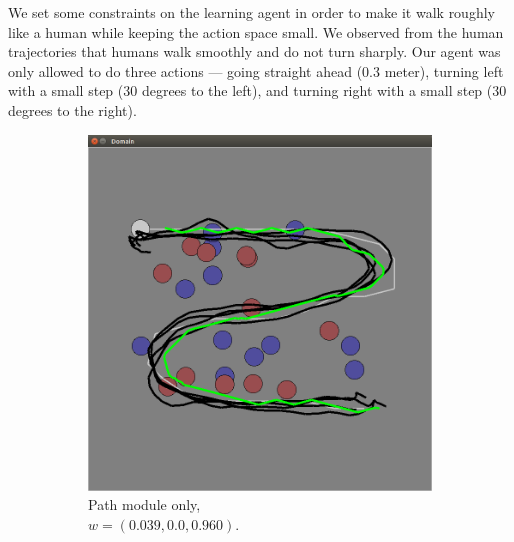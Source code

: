 We set some constraints on the learning agent in order to make it walk roughly
like a human while keeping the action space small.  We observed from the human
trajectories that humans walk smoothly and do not turn sharply.  Our agent was
only allowed to do three actions --- going straight ahead (0.3 meter),
turning left with a small step (30 degrees to the left), and turning right with
a small step (30 degrees to the right).

\begin{figure}[h]
\centering
\begin{subfigure}[b]{0.24\textwidth}
\includegraphics[width=\textwidth]{task_1.png}
\caption{Path module only,\\$w = (0.039, 0.0, 0.960)$. }
\end{subfigure}
\begin{subfigure}[b]{0.24\textwidth}

\end{subfigure}
\end{figure}

